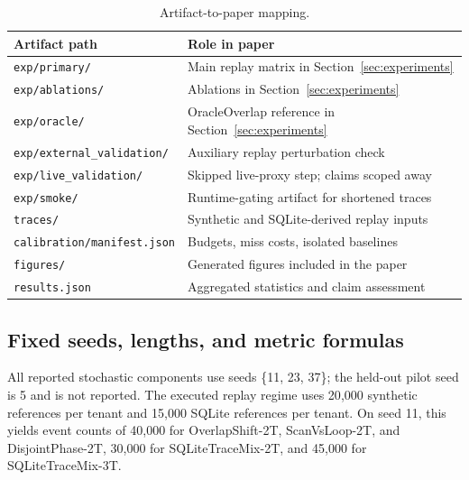 \documentclass{article}
\begin{document}
\begin{table}[h]
\caption{Artifact-to-paper mapping.}
\label{tab:artifact-map}
\centering
\small
\begin{tabular}{ll}
\toprule
Artifact path & Role in paper \\
\midrule
\texttt{exp/primary/} & Main replay matrix in Section~\ref{sec:experiments} \\
\texttt{exp/ablations/} & Ablations in Section~\ref{sec:experiments} \\
\texttt{exp/oracle/} & OracleOverlap reference in Section~\ref{sec:experiments} \\
\texttt{exp/external\_validation/} & Auxiliary replay perturbation check \\
\texttt{exp/live\_validation/} & Skipped live-proxy step; claims scoped away \\
\texttt{exp/smoke/} & Runtime-gating artifact for shortened traces \\
\texttt{traces/} & Synthetic and SQLite-derived replay inputs \\
\texttt{calibration/manifest.json} & Budgets, miss costs, isolated baselines \\
\texttt{figures/} & Generated figures included in the paper \\
\texttt{results.json} & Aggregated statistics and claim assessment \\
\bottomrule
\end{tabular}
\end{table}

\subsection{Fixed seeds, lengths, and metric formulas}

All reported stochastic components use seeds \{11, 23, 37\}; the held-out pilot seed is 5 and is not reported. The executed replay regime uses 20{,}000 synthetic references per tenant and 15{,}000 SQLite references per tenant. On seed 11, this yields event counts of 40{,}000 for OverlapShift-2T, ScanVsLoop-2T, and DisjointPhase-2T, 30{,}000 for SQLiteTraceMix-2T, and 45{,}000 for SQLiteTraceMix-3T.
\end{document}
